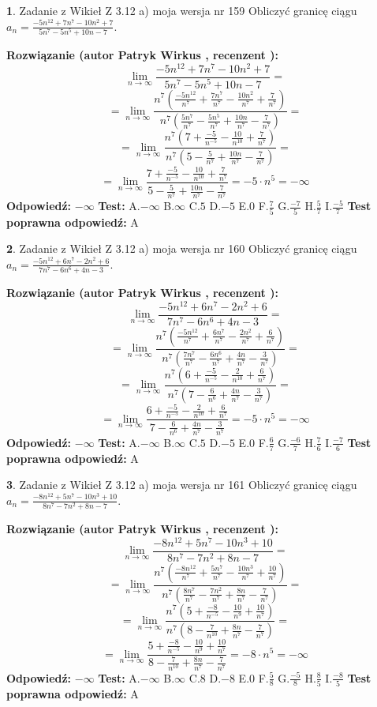 \documentclass[12pt, a4paper]{article}
\theoremstyle{definition} %
\newtheorem{zad}{}
\newcommand{\zadStart}[1]{\begin{zad}#1\newline}
\newcommand{\zadStop}{\end{zad}}
\newcommand{\rozwStart}[2]{\noindent \textbf{Rozwiązanie (autor #1 , recenzent #2): }\newline}
\newcommand{\rozwStop}{\newline}
\newcommand{\odpStart}{\noindent \textbf{Odpowiedź:}\newline}
\newcommand{\odpStop}{\newline}
\newcommand{\testStart}{\noindent \textbf{Test:}\newline}
\newcommand{\testStop}{\newline}
\newcommand{\kluczStart}{\noindent \textbf{Test poprawna odpowiedź:}\newline}
\newcommand{\kluczStop}{\newline}
\begin{document}
\zadStart{Zadanie z Wikieł Z 3.12 a) moja wersja nr 159}
Obliczyć granicę ciągu $a_{n}=\frac{-5n^{12}+7n^{7}-10n^{2}+7}{5n^{7}-5n^{5}+10n-7}$.
\zadStop
\rozwStart{Patryk Wirkus}{}
$$\lim\limits_{n\to\infty}\frac{-5n^{12}+7n^{7}-10n^{2}+7}{5n^{7}-5n^{5}+10n-7}=$$
$$=\lim\limits_{n\to\infty}\frac{n^{7}\left(\frac{-5n^{12}}{n^{7}}+\frac{7n^{7}}{n^{7}}-\frac{10n^{2}}{n^{7}}+\frac{7}{n^{7}}\right)}{n^{7}\left(\frac{5n^{7}}{n^{7}}-\frac{5n^{5}}{n^{7}}+\frac{10n}{n^{7}}-\frac{7}{n^{7}}\right)}=$$
$$=\lim\limits_{n\to\infty}\frac{n^{7}\left(7+\frac{-5}{n^{-5}}-\frac{10}{n^{10}}+\frac{7}{n^{7}}\right)}
{n^{7}\left(5-\frac{5}{n^{7}}+\frac{10n}{n^{7}}-\frac{7}{n^{7}}\right)}=$$
$$=\lim\limits_{n\to\infty}\frac{7+\frac{-5}{n^{-5}}-\frac{10}{n^{10}}+\frac{7}{n^{7}}}{5-\frac{5}{n^{7}}+\frac{10n}{n^{7}}-\frac{7}{n^{7}}}=-5\cdot n^{5} = -\infty$$
\rozwStop
\odpStart
$-\infty$
\odpStop
\testStart
A.$-\infty$
B.$\infty$
C.$5$
D.$-5$
E.$0$
F.$\frac{7}{5}$
G.$\frac{-7}{5}$
H.$\frac{5}{7}$
I.$\frac{-5}{7}$
\testStop
\kluczStart
A
\kluczStop



\zadStart{Zadanie z Wikieł Z 3.12 a) moja wersja nr 160}
Obliczyć granicę ciągu $a_{n}=\frac{-5n^{12}+6n^{7}-2n^{2}+6}{7n^{7}-6n^{6}+4n-3}$.
\zadStop
\rozwStart{Patryk Wirkus}{}
$$\lim\limits_{n\to\infty}\frac{-5n^{12}+6n^{7}-2n^{2}+6}{7n^{7}-6n^{6}+4n-3}=$$
$$=\lim\limits_{n\to\infty}\frac{n^{7}\left(\frac{-5n^{12}}{n^{7}}+\frac{6n^{7}}{n^{7}}-\frac{2n^{2}}{n^{7}}+\frac{6}{n^{7}}\right)}{n^{7}\left(\frac{7n^{7}}{n^{7}}-\frac{6n^{6}}{n^{7}}+\frac{4n}{n^{7}}-\frac{3}{n^{7}}\right)}=$$
$$=\lim\limits_{n\to\infty}\frac{n^{7}\left(6+\frac{-5}{n^{-5}}-\frac{2}{n^{10}}+\frac{6}{n^{7}}\right)}
{n^{7}\left(7-\frac{6}{n^{6}}+\frac{4n}{n^{7}}-\frac{3}{n^{7}}\right)}=$$
$$=\lim\limits_{n\to\infty}\frac{6+\frac{-5}{n^{-5}}-\frac{2}{n^{10}}+\frac{6}{n^{7}}}{7-\frac{6}{n^{6}}+\frac{4n}{n^{7}}-\frac{3}{n^{7}}}=-5\cdot n^{5} = -\infty$$
\rozwStop
\odpStart
$-\infty$
\odpStop
\testStart
A.$-\infty$
B.$\infty$
C.$5$
D.$-5$
E.$0$
F.$\frac{6}{7}$
G.$\frac{-6}{7}$
H.$\frac{7}{6}$
I.$\frac{-7}{6}$
\testStop
\kluczStart
A
\kluczStop



\zadStart{Zadanie z Wikieł Z 3.12 a) moja wersja nr 161}
Obliczyć granicę ciągu $a_{n}=\frac{-8n^{12}+5n^{7}-10n^{3}+10}{8n^{7}-7n^{2}+8n-7}$.
\zadStop
\rozwStart{Patryk Wirkus}{}
$$\lim\limits_{n\to\infty}\frac{-8n^{12}+5n^{7}-10n^{3}+10}{8n^{7}-7n^{2}+8n-7}=$$
$$=\lim\limits_{n\to\infty}\frac{n^{7}\left(\frac{-8n^{12}}{n^{7}}+\frac{5n^{7}}{n^{7}}-\frac{10n^{3}}{n^{7}}+\frac{10}{n^{7}}\right)}{n^{7}\left(\frac{8n^{7}}{n^{7}}-\frac{7n^{2}}{n^{7}}+\frac{8n}{n^{7}}-\frac{7}{n^{7}}\right)}=$$
$$=\lim\limits_{n\to\infty}\frac{n^{7}\left(5+\frac{-8}{n^{-5}}-\frac{10}{n^{9}}+\frac{10}{n^{7}}\right)}
{n^{7}\left(8-\frac{7}{n^{10}}+\frac{8n}{n^{7}}-\frac{7}{n^{7}}\right)}=$$
$$=\lim\limits_{n\to\infty}\frac{5+\frac{-8}{n^{-5}}-\frac{10}{n^{9}}+\frac{10}{n^{7}}}{8-\frac{7}{n^{10}}+\frac{8n}{n^{7}}-\frac{7}{n^{7}}}=-8\cdot n^{5} = -\infty$$
\rozwStop
\odpStart
$-\infty$
\odpStop
\testStart
A.$-\infty$
B.$\infty$
C.$8$
D.$-8$
E.$0$
F.$\frac{5}{8}$
G.$\frac{-5}{8}$
H.$\frac{8}{5}$
I.$\frac{-8}{5}$
\testStop
\kluczStart
A
\kluczStop
\end{document}
